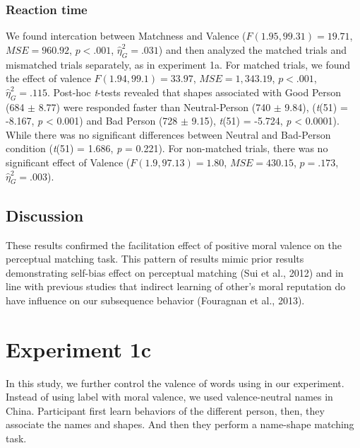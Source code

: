 \documentclass[man]{apa6}
\begin{document}
\hypertarget{reaction-time-1}{%
\subsubsection{Reaction time}\label{reaction-time-1}}

We found intercation between Matchness and Valence (\(F(1.95, 99.31) = 19.71\), \(\mathit{MSE} = 960.92\), \(p < .001\), \(\hat{\eta}^2_G = .031\)) and then analyzed the matched trials and mismatched trials separately, as in experiment 1a. For matched trials, we found the effect of valence \(F(1.94, 99.1) = 33.97\), \(\mathit{MSE} = 1,343.19\), \(p < .001\), \(\hat{\eta}^2_G = .115\). Post-hoc \emph{t}-tests revealed that shapes associated with Good Person (684 \(\pm\) 8.77) were responded faster than Neutral-Person (740 \(\pm\) 9.84), (\emph{t}(51) = -8.167, \emph{p} \textless{} 0.001) and Bad Person (728 \(\pm\) 9.15), \emph{t}(51) = -5.724, \emph{p} \textless{} 0.0001). While there was no significant differences between Neutral and Bad-Person condition (\emph{t}(51) = 1.686, \emph{p} = 0.221). For non-matched trials, there was no significant effect of Valence (\(F(1.9, 97.13) = 1.80\), \(\mathit{MSE} = 430.15\), \(p = .173\), \(\hat{\eta}^2_G = .003\)).

\hypertarget{discussion}{%
\subsection{Discussion}\label{discussion}}

These results confirmed the facilitation effect of positive moral valence on the perceptual matching task. This pattern of results mimic prior results demonstrating self-bias effect on perceptual matching (Sui et al., 2012) and in line with previous studies that indirect learning of other's moral reputation do have influence on our subsequence behavior (Fouragnan et al., 2013).

\hypertarget{experiment-1c}{%
\section{Experiment 1c}\label{experiment-1c}}

In this study, we further control the valence of words using in our experiment. Instead of using label with moral valence, we used valence-neutral names in China. Participant first learn behaviors of the different person, then, they associate the names and shapes. And then they perform a name-shape matching task.
\end{document}
